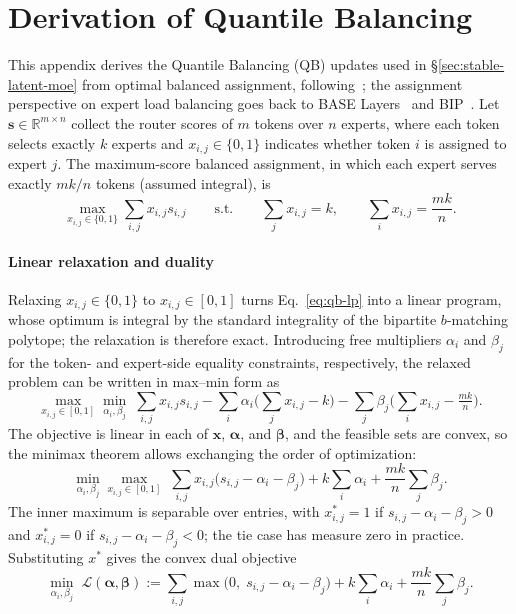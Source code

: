\section{Derivation of Quantile Balancing}
\label{app:qb-derivation}

This appendix derives the Quantile Balancing (QB) updates used in \S\ref{sec:stable-latent-moe} from optimal balanced assignment, following~\citep{su2026qb}; the assignment perspective on expert load balancing goes back to BASE Layers~\citep{lewis2021base} and BIP~\citep{sun2025bip}.
Let $\bm{s}\in\mathbb{R}^{m\times n}$ collect the router scores of $m$ tokens over $n$ experts, where each token selects exactly $k$ experts and $x_{i,j}\in\{0,1\}$ indicates whether token $i$ is assigned to expert $j$.
The maximum-score balanced assignment, in which each expert serves exactly $mk/n$ tokens (assumed integral), is
\begin{equation}
    \max_{x_{i,j}\in\{0,1\}} \sum_{i,j} x_{i,j}s_{i,j}
    \qquad \text{s.t.}\qquad
    \sum_j x_{i,j}=k,
    \qquad
    \sum_i x_{i,j}=\frac{mk}{n}.
    \label{eq:qb-lp}
\end{equation}

\paragraph{Linear relaxation and duality}
Relaxing $x_{i,j}\in\{0,1\}$ to $x_{i,j}\in[0,1]$ turns Eq.~\ref{eq:qb-lp} into a linear program, whose optimum is integral by the standard integrality of the bipartite $b$-matching polytope; the relaxation is therefore exact.
Introducing free multipliers $\alpha_i$ and $\beta_j$ for the token- and expert-side equality constraints, respectively, the relaxed problem can be written in max--min form as
\begin{equation}
    \max_{x_{i,j}\in[0,1]}\min_{\alpha_i,\beta_j}\;
    \sum_{i,j} x_{i,j}s_{i,j}
    - \sum_i \alpha_i\Big(\sum_j x_{i,j} - k\Big)
    - \sum_j \beta_j\Big(\sum_i x_{i,j} - \tfrac{mk}{n}\Big).
    \label{eq:qb-max-min}
\end{equation}
The objective is linear in each of $\bm{x}$, $\bm{\alpha}$, and $\bm{\beta}$, and the feasible sets are convex, so the minimax theorem allows exchanging the order of optimization:
\begin{equation}
    \min_{\alpha_i,\beta_j}\max_{x_{i,j}\in[0,1]}\;
    \sum_{i,j} x_{i,j}\big(s_{i,j} - \alpha_i - \beta_j\big)
    + k\sum_i \alpha_i
    + \frac{mk}{n}\sum_j \beta_j.
    \label{eq:qb-min-max}
\end{equation}
The inner maximum is separable over entries, with $x_{i,j}^*=1$ if $s_{i,j}-\alpha_i-\beta_j>0$ and $x_{i,j}^*=0$ if $s_{i,j}-\alpha_i-\beta_j<0$; the tie case has measure zero in practice.
Substituting $x^*$ gives the convex dual objective
\begin{equation}
    \min_{\alpha_i,\beta_j}\;
    \mathcal{L}(\bm{\alpha},\bm{\beta})
    := \sum_{i,j}\max\big(0,\; s_{i,j} - \alpha_i - \beta_j\big)
    + k\sum_i \alpha_i
    + \frac{mk}{n}\sum_j \beta_j.
    \label{eq:qb-dual}
\end{equation}

